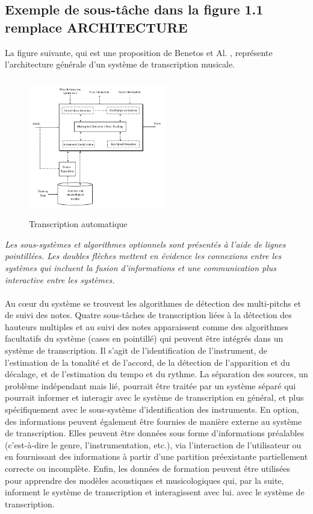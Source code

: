 \subsection*{Exemple de sous-tâche dans la figure 1.1 remplace ARCHITECTURE}
La figure suivante, qui est une proposition de Benetos et Al. \cite{article1}, représente l'architecture générale d'un système de transcription musicale.
\begin{figure}[h]
	\includegraphics[height=60mm, width=60mm]{z_images/1_automatic_transcription/0_general_process.png}
	\caption{Transcription automatique}
\end{figure}
\textit{Les sous-systèmes et algorithmes optionnels sont présentés à l'aide de lignes pointillées. Les doubles flèches mettent en évidence les connexions entre les systèmes qui incluent la fusion d'informations et une communication plus interactive entre les systèmes.}\\\\
Au cœur du système se trouvent les algorithmes de détection des multi-pitchs et de suivi des notes. Quatre sous-tâches de transcription liées à la détection des hauteurs multiples et au suivi des notes apparaissent comme des algorithmes facultatifs du système (cases en pointillé) qui peuvent être intégrés dans un système de transcription. Il s'agit de l'identification de l'instrument, de l'estimation de la tonalité et de l'accord, de la détection de l'apparition et du décalage, et de l'estimation du tempo et du rythme. La séparation des sources, un problème indépendant mais lié, pourrait être traitée par un système séparé qui pourrait informer et interagir avec le système de transcription en général, et plus spécifiquement avec le sous-système d'identification des instruments.
En option, des informations peuvent également être fournies de manière externe au système de transcription. Elles peuvent être données sous forme d'informations préalables (c'est-à-dire le genre, l'instrumentation, etc.), via l'interaction de l'utilisateur ou en fournissant des informations à partir d'une partition préexistante partiellement correcte ou incomplète. Enfin, les données de formation peuvent être utilisées pour apprendre des modèles acoustiques et musicologiques qui, par la suite, informent le système de transcription et interagissent avec lui. avec le système de transcription.\\
